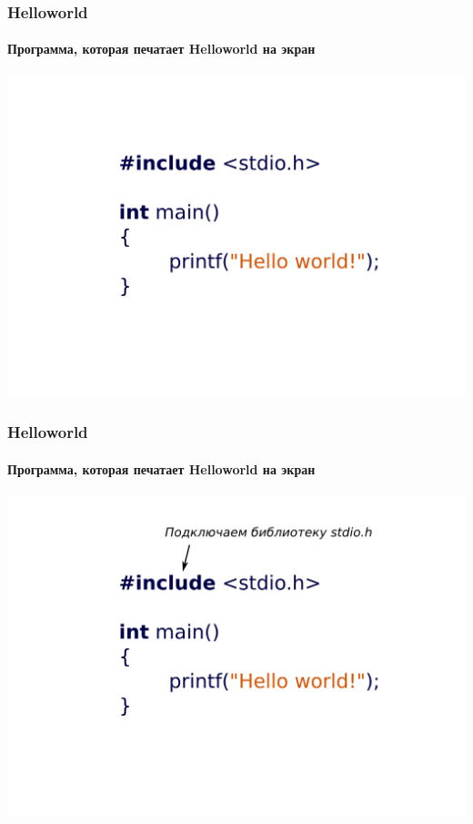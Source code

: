 \documentclass[12pt,pdf,hyperref={unicode}]{beamer}
\begin{document}
\begin{frame}[fragile]
\frametitle{Helloworld} 
\framesubtitle{Программа, которая печатает Helloworld на экран} 
\begin{center}
\includegraphics[width=0.99\linewidth]{images/hw1.png}
\end{center}
\end{frame}

\begin{frame}[fragile]
\frametitle{Helloworld} 
\framesubtitle{Программа, которая печатает Helloworld на экран} 
\begin{center}
\includegraphics[width=0.99\linewidth]{images/hw2.png}
\end{center}
\end{frame}
\end{document}
